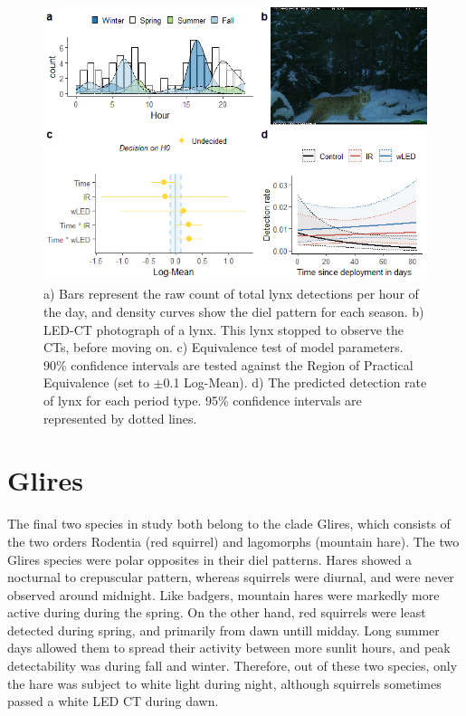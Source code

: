 \begin{figure}
	\centering
	\includegraphics[width=12cm]{../R/glmm_sp_files/figure-html/gaupe2-1.png}
	\caption[Lynx]
	{\scriptsize
		a) Bars represent the raw count of total lynx detections per hour of the day, and density curves show the diel pattern for each season.
		b) LED-CT photograph of a lynx. This lynx stopped to observe the CTs, before moving on.
		c) Equivalence test of model parameters. 90\% confidence intervals are tested against the Region of Practical Equivalence (set to $\pm$0.1 Log-Mean). 
		d) The predicted detection rate of lynx for each period type. 95\% confidence intervals are represented by dotted lines.}
	\label{gaupe}
\end{figure}



\section{Glires}
The final two species in study both belong to the clade Glires, which consists of the two orders Rodentia (red squirrel) and lagomorphs (mountain hare). 
The two Glires species were polar opposites in their diel patterns. Hares showed a nocturnal to crepuscular pattern, whereas squirrels were diurnal, and were never observed around midnight.
Like badgers, mountain hares were markedly more active during during the spring.
On the other hand, red squirrels were least detected during spring, and primarily from dawn untill midday. Long summer days allowed them to spread their activity between more sunlit hours, and peak detectability was during fall and winter.
Therefore, out of these two species, only the hare was subject to white light during night, although squirrels sometimes passed a white LED CT during dawn.

